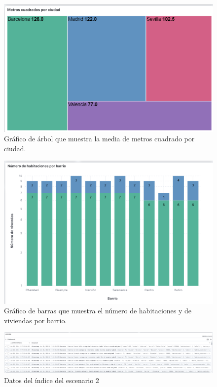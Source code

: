 \begin{figure}
    \centering
    \includegraphics[width=1\linewidth]{img/graficoViv.png}
    \caption{Gráfico de árbol que muestra la media de metros cuadrado por ciudad.}
    \label{fig:treemap2}
\end{figure}

\begin{figure}
    \centering
    \includegraphics[width=1\linewidth]{img/barras2Viv.png}
    \caption{Gráfico de barras que muestra el número de habitaciones y de viviendas por barrio.}
    \label{fig:barrasViv2}
\end{figure}

\begin{figure}
    \centering
    \includegraphics[width=1\linewidth]{img/datosViv.png}
    \caption{Datos del índice del escenario 2}
    \label{fig:datos2}
\end{figure}

